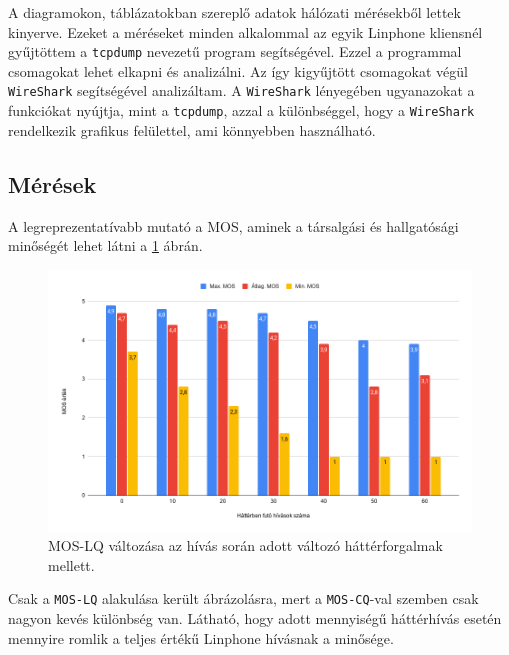 A diagramokon, táblázatokban szereplő adatok hálózati mérésekből lettek kinyerve. Ezeket 
a méréseket minden alkalommal az egyik Linphone kliensnél gyűjtöttem a \texttt{tcpdump} 
nevezetű program segítségével. Ezzel a programmal csomagokat lehet elkapni és analizálni. 
Az így kigyűjtött csomagokat végül \texttt{WireShark} segítségével analizáltam. A 
\texttt{WireShark} lényegében ugyanazokat a funkciókat nyújtja, mint a \texttt{tcpdump}, 
azzal a különbséggel, hogy a \texttt{WireShark} rendelkezik grafikus felülettel, ami 
könnyebben használható. 

\subsection{Mérések}

A legreprezentatívabb mutató a MOS, aminek a társalgási és hallgatósági minőségét lehet 
látni a \ref{fig:moslq} ábrán.

\begin{figure}[!ht]
	\centering
	\includegraphics[width=1\textwidth, keepaspectratio]{figures/mos.png}
	\caption{MOS-LQ változása az hívás során adott változó háttérforgalmak mellett.}
	\label{fig:moslq}
\end{figure}

Csak a \texttt{MOS-LQ} alakulása került ábrázolásra, mert a \texttt{MOS-CQ}-val szemben 
csak nagyon kevés különbség van. Látható, hogy adott mennyiségű háttérhívás esetén mennyire romlik a teljes értékű Linphone hívásnak a minősége.


